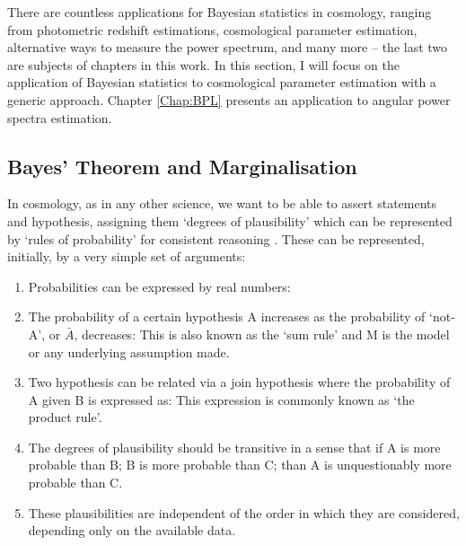 \qquad There are countless applications for Bayesian statistics in cosmology, ranging from photometric redshift estimations, cosmological parameter estimation, alternative ways to measure the power spectrum, and many more -- the last two are subjects of chapters in this work. In this section, I will focus on the application of Bayesian statistics to cosmological parameter estimation with a generic approach. Chapter \ref{Chap:BPL} presents an application to angular power spectra estimation.


\subsection{Bayes' Theorem and Marginalisation}
In cosmology, as in any other science, we want to be able to assert statements and hypothesis, assigning them `degrees of plausibility' which can be represented by `rules of probability' for consistent reasoning \citep{sivia2006data}. These can be represented, initially, by a very simple set of arguments:
\begin{enumerate}
\item Probabilities can be expressed by real numbers:
\item The probability of a certain hypothesis A increases as the probability of `not-A', or $\bar{A}$, decreases:
This is also known as the `sum rule' and M is the model or any underlying assumption made.
\item Two hypothesis can be related via a join hypothesis where the probability of A given B is expressed as:
This expression is commonly known as `the product rule'.
\item The degrees of plausibility should be transitive in a sense that if A is more probable than B; B is more probable than C; than A is unquestionably more probable than C.

\item These plausibilities are independent of the order in which they are considered, depending only on the available data.
\end{enumerate}


